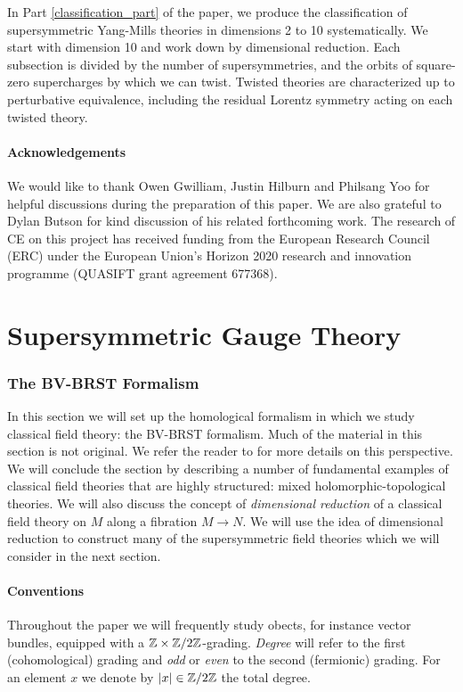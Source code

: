 \documentclass[10pt, oneside]{article}
\begin{document}
In Part \ref{classification_part} of the paper, we produce the classification of supersymmetric Yang-Mills theories in dimensions 2 to 10 systematically.  We start with dimension 10 and work down by dimensional reduction.  Each subsection is divided by the number of supersymmetries, and the orbits of square-zero supercharges by which we can twist.  Twisted theories are characterized up to perturbative equivalence, including the residual Lorentz symmetry acting on each twisted theory.

\subsection*{Acknowledgements}
We would like to thank Owen Gwilliam, Justin Hilburn and Philsang Yoo for helpful discussions during the preparation of this paper.  We are also grateful to Dylan Butson for kind discussion of his related forthcoming work.  The research of CE on this project has received funding from the European Research Council (ERC) under the European Union's Horizon 2020 research and innovation programme (QUASIFT grant agreement 677368).

\pagestyle{standard}
\part{Supersymmetric Gauge Theory} \label{formalism_part}

\section{The BV-BRST Formalism} \label{BV_section}

In this section we will set up the homological formalism in which we study classical field theory: the BV-BRST formalism.  Much of the material in this section is not original.  We refer the reader to \cite{CostelloBook, Book2} for more details on this perspective.  We will conclude the section by describing a number of fundamental examples of classical field theories that are highly structured: mixed holomorphic-topological theories.  We will also discuss the concept of \emph{dimensional reduction} of a classical field theory on $M$ along a fibration $M \to N$.  We will use the idea of dimensional reduction to construct many of the supersymmetric field theories which we will consider in the next section.  

\subsection{Conventions}
Throughout the paper we will frequently study obects, for instance vector bundles, equipped with a $\mathbb Z\times\mathbb Z/2\mathbb Z$-grading. \emph{Degree} will refer to the first (cohomological) grading and \emph{odd} or \emph{even} to the second (fermionic) grading.  For an element $x$ we denote by $|x|\in\mathbb Z/2\mathbb Z$ the total degree.
\end{document}

